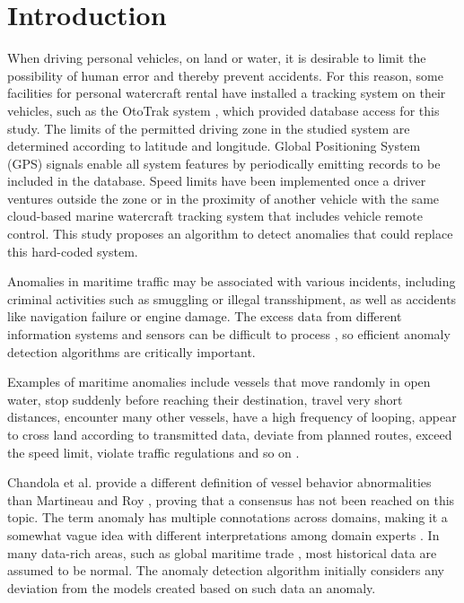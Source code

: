 \documentclass[preprint,12pt]{elsarticle}
\begin{document}


\section{Introduction}
 
When driving personal vehicles, on land or water, it is desirable to limit the possibility of human error and thereby prevent accidents. For this reason, some facilities for personal watercraft rental have installed a tracking system on their vehicles, such as the OtoTrak system \cite{ototrakOtoTrakTrack}, which provided database access for this study. The limits of the permitted driving zone in the studied system \cite{ototrakOtoTrakTrack} are determined according to latitude and longitude. Global Positioning System (GPS) signals enable all system features \cite{ototrakOtoTrakTrack} by periodically emitting records to be included in the database. Speed limits have been implemented once a driver ventures outside the zone or in the proximity of another vehicle with the same cloud-based marine watercraft tracking system that includes vehicle remote control. This study proposes an algorithm to detect anomalies that could replace this hard-coded system.
 
Anomalies in maritime traffic may be associated with various incidents, including criminal activities such as smuggling or illegal transshipment, as well as accidents like navigation failure or engine damage. The excess data from different information systems and sensors can be difficult to process \citep{2013Kazemi}, so efficient anomaly detection algorithms are critically important.

Examples of maritime anomalies include vessels that move randomly in open water, stop suddenly before reaching their destination, travel very short distances, encounter many other vessels, have a high frequency of looping, appear to cross land according to transmitted data, deviate from planned routes, exceed the speed limit, violate traffic regulations and so on \citep{2014Mascaro, 2008Laxhammar}.

Chandola et al. \citep{2009Chandola} provide a different definition of vessel behavior abnormalities than Martineau and Roy \citep{2011Martineau}, proving that a consensus has not been reached on this topic. The term anomaly has multiple connotations across domains, making it a somewhat vague idea with different interpretations among domain experts \citep{2008Roy}. In many data-rich areas, such as global maritime trade \citep{2022Kim}, most historical data are assumed to be normal. The anomaly detection algorithm initially considers any deviation from the models created based on such data an anomaly.
\end{document}
